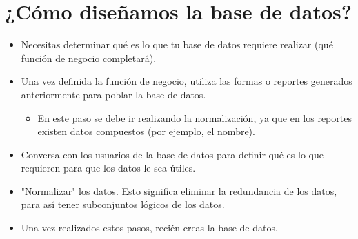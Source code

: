 \documentclass[11pt]{article}
\begin{document}
\section{¿Cómo diseñamos la base de datos?}
\begin{itemize}
	\item Necesitas determinar qué es lo que tu base de datos requiere realizar (qué función de negocio completará).
	\item Una vez definida la función de negocio, utiliza las formas o reportes generados anteriormente para poblar la base de datos.
	\begin{itemize}
		\item En este paso se debe ir realizando la normalización, ya que en los reportes existen datos compuestos (por ejemplo, el nombre).
	\end{itemize}
	\item Conversa con los usuarios de la base de datos para definir qué es lo que requieren para que los datos le sea útiles.
	\item "Normalizar" los datos. Esto significa eliminar la redundancia de los datos, para así tener subconjuntos lógicos de los datos.
	\item Una vez realizados estos pasos, recién creas la base de datos.
	
\end{itemize}
\end{document}
